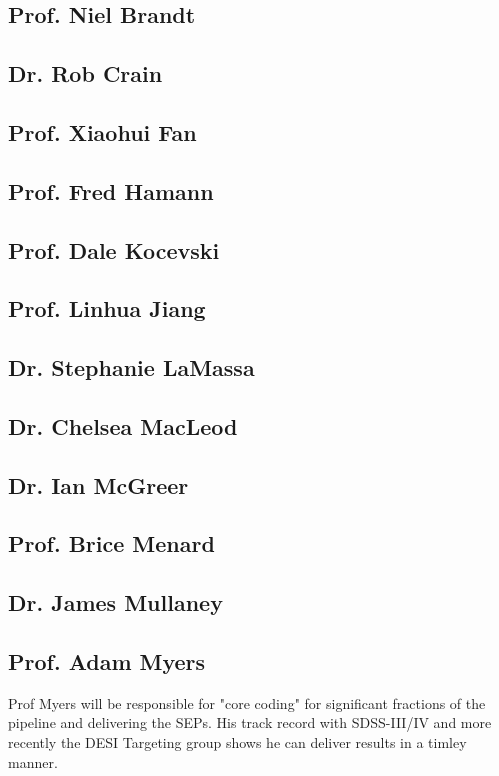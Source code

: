 \subsection{Prof. Niel Brandt}


\subsection{Dr. Rob Crain}


\subsection{Prof. Xiaohui Fan}


\subsection{Prof. Fred Hamann}


\subsection{Prof. Dale Kocevski}


\subsection{Prof. Linhua Jiang}


\subsection{Dr. Stephanie LaMassa}


\subsection{Dr. Chelsea MacLeod}


\subsection{Dr. Ian McGreer}


\subsection{Prof. Brice Menard}	


\subsection{Dr. James Mullaney}


\subsection{Prof. Adam Myers}
Prof Myers will be responsible for "core coding" for significant
fractions of the pipeline and delivering the SEPs. His track record
with SDSS-III/IV and more recently the DESI Targeting group shows he
can deliver results in a timley manner.


